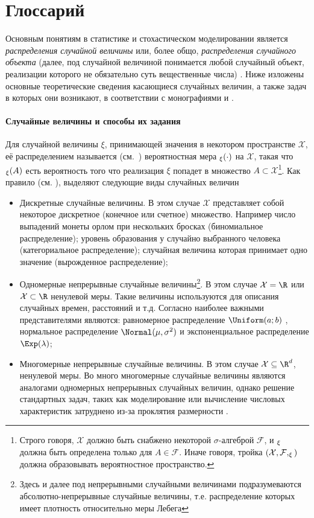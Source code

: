\chapter{Глоссарий}
Основным понятиям в статистике и стохастическом моделировании является \emph{распределения случайной величины} или, более общо, \emph{распределения случайного объекта} (далее, под случайной величиной понимается любой случайный объект, реализации которого не обязательно суть вещественные числа) \cite{knuth2014art}. Ниже изложены основные теоретические сведения касающиеся случайных величин, а также задач в которых они возникают, в соответствии с монографиями \cite{Feller2013} и \cite{shiryaev2007prob}. 

\subsubsection*{Случайные величины и способы их задания} 
Для случайной величины $\xi$, принимающей значения в некотором пространстве $\mathcal{X}$, её распределением называется (см{.}~\cite{shiryaev2007prob}) вероятностная мера $\P_\xi(\cdot)$ на $\mathcal{X}$, такая что $\P_\xi(A)$ есть вероятность того что реализация $\xi$ попадет в множество $A \subset \mathcal{X}$\footnote{Строго говоря, $\mathcal{X}$ должно быть снабжено некоторой $\sigma$-алгеброй $\mathcal{F}$, и $\P_\xi$ должна быть определена только для $A \in \mathcal{F}$. Иначе говоря, тройка $(\mathcal{X}, \mathcal{F}, \P_\xi)$ должна образовывать вероятностное пространство.}. Как правило (см{.} \cite{Feller2013}),  выделяют следующие виды случайных величин 
\begin{itemize}[noitemsep, topsep=0pt, parsep=3pt]
    \item Дискретные случайные величины. В этом случае $\mathcal{X}$ представляет собой некоторое дискретное (конечное или счетное) множество. Например число выпадений монеты орлом при нескольких бросках (биномиальное распределение);  уровень образования у случайно выбранного человека (категориальное распределение); случайная величина которая принимает одно значение (вырожденное распределение);
    \item Одномерные непрерывные случайные величины\footnote{Здесь и далее под непрерывными случайными величинами подразумеваются абсолютно-непрерывные случайные величины, т.е. распределение которых имеет плотность относительно меры Лебега}. В этом случае $\mathcal{X} = \R$ или $\mathcal{X} \subset \R$ ненулевой меры. Такие величины используются для описания случайных времен, расстояний и т{.}д{.} Согласно \cite{knuth2014art} наиболее важными представителями являются: равномерное распределение $\Uniform(a; b)$ , нормальное распределение $\Normal(\mu, \sigma^2)$ и экспоненциальное распределение $\Exp(\lambda)$;
    \item Многомерные непрерывные случайные величины. В этом случае $\mathcal{X} \subseteq \R^d$, ненулевой меры. Во много многомерные случайные величины являются аналогами одномерных непрерывных случайных величин, однако решение стандартных задач, таких как моделирование или вычисление числовых характеристик затруднено из-за проклятия размерности \cite{donoho2000high}.  
\end{itemize}
